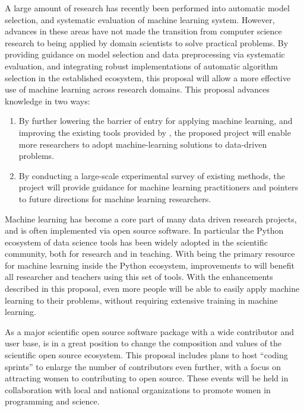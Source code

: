A large amount of research has recently been performed into automatic model
selection, and systematic evaluation of machine learning system.
However, advances in these areas have not made the transition from computer
science research to being applied by domain scientists to solve practical
problems.
By providing guidance on model selection and data preprocessing via
systematic evaluation, and integrating robust implementations of automatic
algorithm selection in the established \sklearn{} ecosystem, this proposal
will allow a more effective use of machine learning across research domains.
%
\vspace{-3mm}
\vspace{-3mm}
This proposal advances knowledge in two ways:
\begin{enumerate}
    \item By further lowering the barrier of entry for applying machine
        learning, and improving the existing tools provided by \sklearn{}, the
        proposed project will enable more researchers to adopt machine-learning
        solutions to data-driven problems.
    \item By conducting a large-scale experimental survey of existing methods,
        the project will provide guidance for machine learning practitioners
        and pointers to future directions for machine learning researchers.
\end{enumerate}
%
\vspace{-6mm}
\vspace{-3mm}
Machine learning has become a core part of many data driven research projects,
and is often implemented via open source software.
In particular the Python ecosystem of data science tools has been widely
adopted in the scientific community, both for research and in teaching.
With \sklearn{} being the primary resource for machine learning inside
the Python ecosystem, improvements to \sklearn{} will benefit all researcher
and teachers using this set of tools.
With the enhancements described in this proposal, even more people
will be able to easily apply machine learning to their problems,
without requiring extensive training in machine learning.

As a major scientific open source software package with a wide contributor
and user base, \sklearn{} is in a great position to change
the composition and values of the scientific open source ecosystem.
This proposal includes plans to host ``coding sprints'' to enlarge the number
of contributors even further, with a focus on attracting women to contributing
to open source. These events will be held in collaboration with local and
national organizations to promote women in programming and science.
